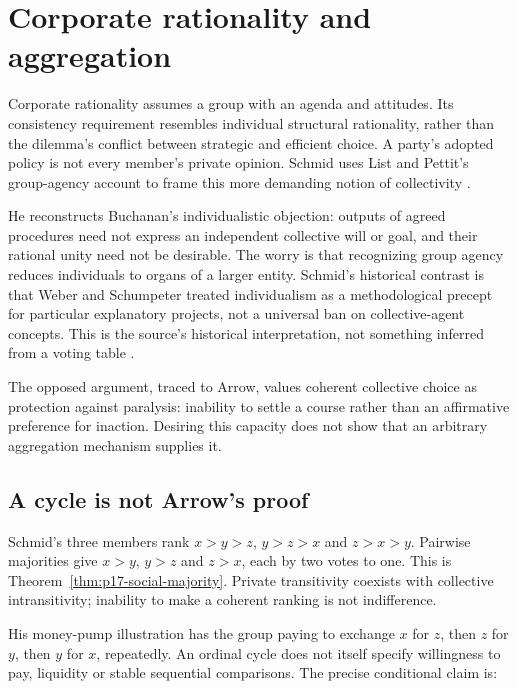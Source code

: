 \section{Corporate rationality and aggregation}
\label{sec:p17-rat102-corporation}

Corporate rationality assumes a group with an agenda and attitudes. Its
consistency requirement resembles individual structural rationality, rather
than the dilemma's conflict between strategic and efficient choice.
A party's adopted policy is not every member's private opinion. Schmid
uses List and Pettit's group-agency account to frame this more demanding
notion of collectivity
\parencite[pp.~594--596]{Schmid2021CollectiveRationality}.

He reconstructs Buchanan's individualistic objection: outputs of agreed
procedures need not express an independent collective will or goal, and
their rational unity need not be desirable. The worry is that recognizing
group agency reduces individuals to organs of a larger entity. Schmid's
historical contrast is that Weber and Schumpeter treated individualism as a
methodological precept for particular explanatory projects, not a universal
ban on collective-agent concepts. This is the source's historical
interpretation, not something inferred from a voting table
\parencite[pp.~594--595]{Schmid2021CollectiveRationality}.

The opposed argument, traced to Arrow, values coherent collective choice
as protection against paralysis: inability to settle a course rather than
an affirmative preference for inaction. Desiring this capacity does not
show that an arbitrary aggregation mechanism supplies it.

\subsection{A cycle is not Arrow's proof}

Schmid's three members rank \(x>y>z\), \(y>z>x\) and \(z>x>y\).
Pairwise majorities give \(x>y\), \(y>z\) and \(z>x\), each by two votes
to one. This is Theorem~\ref{thm:p17-social-majority}. Private
transitivity coexists with collective intransitivity; inability to make
a coherent ranking is not indifference.

His money-pump illustration has the group paying to exchange \(x\) for
\(z\), then \(z\) for \(y\), then \(y\) for \(x\), repeatedly.
An ordinal cycle does not itself specify willingness to pay, liquidity or
stable sequential comparisons. The precise conditional claim is:

